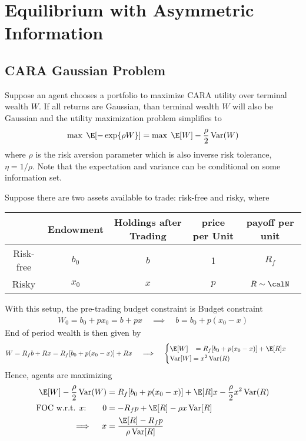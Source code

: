 \documentclass[12pt]{article}
\theoremstyle{plain}
\theoremstyle{definition}
\theoremstyle{remark}
\newcommand{\Var}{\operatorname{Var}}
\begin{document}
\clearpage
\section{Equilibrium with Asymmetric Information}

\subsection{CARA Gaussian Problem}

Suppose an agent chooses a portfolio to maximize CARA utility over
terminal wealth $W$. If all returns are Gaussian, than terminal wealth
$W$ will also be Gaussian and the utility maximization problem
simplifies to
\begin{align*}
  \max\; \E[-\exp\{\rho W\}]
  =
  \max \; \E[W] - \frac{\rho}{2} \Var(W)
\end{align*}
where $\rho$ is the risk aversion parameter which is also inverse risk
tolerance, $\eta=1/\rho$.
Note that the expectation and variance can be conditional on some
information set.

Suppose there are two assets available to trade: risk-free and risky,
where
\begin{table}[htbp!]
\centering
\begin{tabular}{c|cccc}
  & Endowment & Holdings after Trading & price per Unit & payoff per unit \\\hline\hline
  Risk-free & $b_0$ & $b$ & 1 & $R_f$ \\
  Risky & $x_0$ & $x$ & $p$ & $R\sim\calN$ \\
\end{tabular}
\end{table}
With this setup, the pre-trading budget constraint is
Budget constraint
\begin{align*}
  W_0 = b_0 + px_0 = b + px
  \quad\implies\quad
  b = b_0 + p(x_0 - x)
\end{align*}
End of period wealth is then given by
\begin{align*}
  W
  &= R_f b + R x
  = R_f [b_0 + p(x_0 - x)] + R x
  \quad \implies\quad
  \begin{cases}
    \E[W]
    \;\;\;= R_f [b_0 + p(x_0 - x)] + \E[R] x
    \\
    \Var[W]
    = x^2\Var(R)
  \end{cases}
\end{align*}
Hence, agents are maximizing
\begin{align*}
  \E[W]
  -\frac{\rho}{2}\Var(W)
  &=
  R_f [b_0 + p(x_0 - x)] + \E[R] x
  - \frac{\rho}{2} x^2\Var(R)
  \\
  \text{FOC w.r.t. $x$:}\qquad
  0 &= -R_fp + \E[R] - \rho x\Var[R]
  \\
  \quad\implies\quad
  x &= \frac{\E[R] - R_fp}{\rho\Var[R]}
\end{align*}
\end{document}
